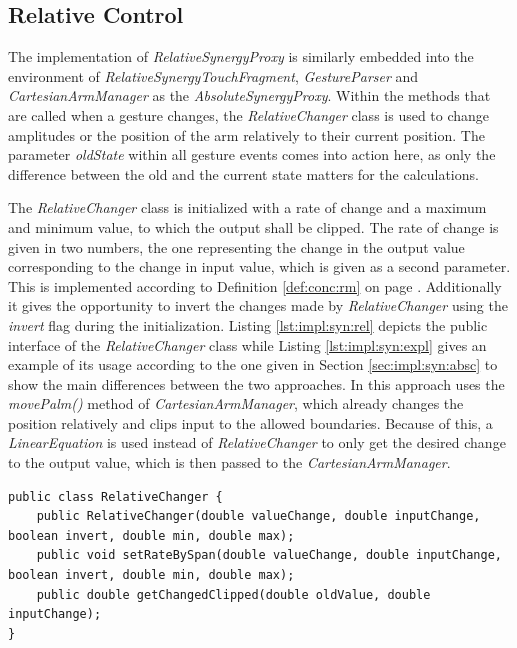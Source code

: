 \subsection{Relative Control}

The implementation of \textit{RelativeSynergyProxy} is similarly embedded into the environment of \textit{RelativeSynergyTouchFragment}, \textit{GestureParser} and \textit{CartesianArmManager} as the \textit{AbsoluteSynergyProxy}. Within the methods that are called when a gesture changes, the \textit{RelativeChanger} class is used to change amplitudes or the position of the arm relatively to their current position. The parameter \textit{oldState} within all gesture events comes into action here, as only the difference between the old and the current state matters for the calculations. 

The \textit{RelativeChanger} class is initialized with a rate of change and a maximum and minimum value, to which the output shall be clipped. The rate of change is given in two numbers, the one representing the change in the output value corresponding to the change in input value, which is given as a second parameter. This is implemented according to Definition \ref{def:conc:rm} on page \pageref{def:conc:rm}. Additionally it gives the opportunity to invert the changes made by \textit{RelativeChanger} using the \textit{invert} flag during the initialization. Listing \ref{lst:impl:syn:rel} depicts the public interface of the \textit{RelativeChanger} class while Listing \ref{lst:impl:syn:expl} gives an example of its usage according to the one given in Section \ref{sec:impl:syn:absc} to show the main differences between the two approaches. In this approach uses the \textit{movePalm()} method of \textit{CartesianArmManager}, which already changes the position relatively and clips input to the allowed boundaries. Because of this, a \textit{LinearEquation} is used instead of \textit{RelativeChanger} to only get the desired change to the output value, which is then passed to the \textit{CartesianArmManager}.

\begin{lstlisting}[caption={Public interface of the RelativeChanger class},label=lst:impl:syn:rel]
public class RelativeChanger {
	public RelativeChanger(double valueChange, double inputChange, boolean invert, double min, double max);
	public void setRateBySpan(double valueChange, double inputChange, boolean invert, double min, double max);
	public double getChangedClipped(double oldValue, double inputChange);
}
\end{lstlisting}

